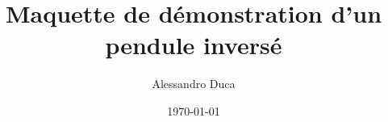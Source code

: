\author{Alessandro Duca}


\title{Maquette de démonstration d'un pendule inversé}



\date{\today}



